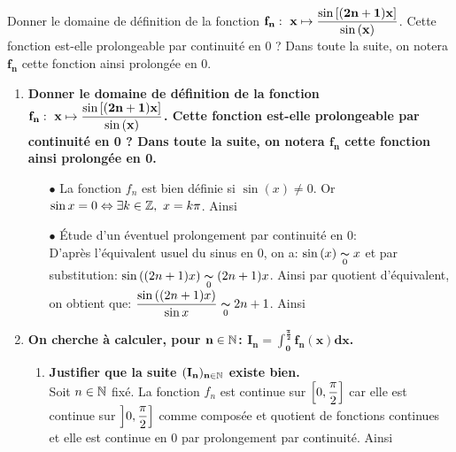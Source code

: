 \documentclass[a4paper, 11pt,reqno]{article}
\begin{document}
\begin{exercice}
    Donner le domaine de d\'efinition de la fonction $\mathbf{f_n:\ x\mapsto \displaystyle\frac{ \sin{\lbrack (2n+1)x  \rbrack} }{ \sin{(x)} } }$. Cette fonction est-elle prolongeable par continuit\'e en 0 ? Dans toute la suite, on notera $\mathbf{f_n}$ cette fonction ainsi prolong\'ee en 0. 
\end{exercice}
\begin{correction}
	\begin{enumerate}
		\item  \textbf{Donner le domaine de d\'efinition de la fonction $\mathbf{f_n:\ x\mapsto \displaystyle\frac{ \sin{\lbrack (2n+1)x  \rbrack} }{ \sin{(x)} } }$. Cette fonction est-elle prolongeable par continuit\'e en 0 ? Dans toute la suite, on notera $\mathbf{f_n}$ cette fonction ainsi prolong\'ee en 0. }
		      \begin{itemize}
			      \item[$\bullet$] La fonction $f_n$ est bien d\'efinie si $\sin{(x)}\not= 0$. Or $\sin{x}=0\Leftrightarrow \exists k\in\Z,\ x=k\pi$. Ainsi 
			      \item[$\bullet$] \'Etude d'un \'eventuel prolongement par continuit\'e en 0:\\
			            \noindent D'apr\`{e}s l'\'equivalent usuel du sinus en 0, on a: $\sin{(x)}\underset{0}{\thicksim}x$ et par substitution: $\sin{((2n+1)x)} \underset{0}{\thicksim} (2n+1)x$. Ainsi par quotient d'\'equivalent, on obtient que: $ \displaystyle\frac{\sin{((2n+1)x)}}{\sin{x}} \underset{0}{\thicksim}  2n+1$. Ainsi 
		      \end{itemize}
		\item  \textbf{On cherche \`a calculer, pour $\mathbf{n\in\mathbb{N}}$: $\mathbf{I_n=\int_0^{\frac{\pi}{2}} f_n(x)dx } $.}
		      \begin{enumerate}
			      \item  \textbf{Justifier que la suite $\mathbf{(I_n)_{n\in\mathbb{N}}}$ existe bien.}\\
			            \noindent Soit $n\in\mathbb{N}$ fix\'e. La fonction $f_n$ est continue sur $\left\lbrack 0,\displaystyle\frac{\pi}{2}\right\rbrack$ car elle est continue sur $\left\rbrack 0,\displaystyle\frac{\pi}{2}\right\rbrack$ comme compos\'ee et quotient de fonctions continues et elle est continue en 0 par prolongement par continuit\'e. Ainsi 

\end{enumerate}
\end{enumerate}
\end{correction}
\end{document}
